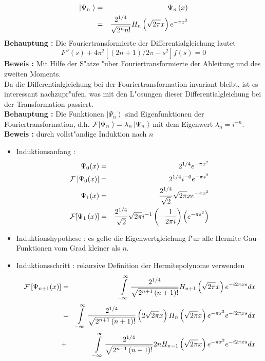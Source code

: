 \documentclass[11pt,twoside]{report}
\begin{document}
\begin{eqnarray*}
  |\Psi_n\left.\right> & = & \Psi_n \left( x \right) \\
                       & = & \frac{2^{1/4}} {\sqrt{2^n n!}} H_n \left( \sqrt{2\pi}x \right) e^{ -\pi x^2 } 
\end{eqnarray*}
{\bf Behauptung : } Die Fouriertransformierte der Differentialgleichung lautet
$$F''\left( s\right) + 4\pi ^2\left[ \left(2n + 1\right)/2 \pi - s^2\right] f\left( s\right) = 0$$
{\bf Beweis : } Mit Hilfe der S"atze "uber Fouriertransformierte der Ableitung und des zweiten Moments. \\
Da die Differentialgleichung bei der Fouriertransformation invariant bleibt, ist es interessant nachzupr"ufen, was mit den L"osungen dieser Differentialgleichung bei der Transformation passiert. \\[1cm]
{\bf Behauptung :} Die Funktionen 
$ |\Psi_n \left. \right> $ sind Eigenfunktionen der Fouriertransformation, d.h. $ {\cal F}|\Psi_n\left.\right> = \lambda_n \, |\Psi_n\left.\right> $ mit dem Eigenwert $\lambda_n = i^{-n}$. \\
{\bf Beweis :} durch vollst"andige Induktion nach $n$ 
\begin{itemize}
\item Induktionsanfang : 
\begin{eqnarray*}
 \Psi_0 (x) & = & 
 2^{1/4} e^{ -\pi x^2 }\\
 {\cal F} \left[\Psi_0 (x)\right] & = &
 2^{1/4} i^{-0} e^{ -\pi s^2 } \\
 \Psi_1 (x) & = &
 \frac{2^{1/4}}{\sqrt{2}} \sqrt{2 \pi}x e^{ -\pi x^2 } \\
 {\cal F}[ \Psi_1 \left( x \right)] & = & 
 \frac{2^{1/4}}{\sqrt{2}} \sqrt{2\pi} i^{-1} \left( - \frac{1}{2\pi i} \right) \left( e^{ -\pi s^2 } \right)                   
\end{eqnarray*}
\item Induktionshypothese : es gelte die Eigenwertgleichung f"ur alle Hermite-Gau\3-Funk\-tio\-nen vom Grad kleiner als $n$.
\item Induktionsschritt : rekursive Definition der Hermitepolynome verwenden
\begin{eqnarray*}
  {\cal F} \left[ \Psi_{n+1} (x) \right]  & = &
  \int\limits_{-\infty}^{\infty} \frac{2^{1/4}}{\sqrt{2^{n+1} \left( n+1 \right) ! }} H_{n+1} \left( \sqrt{2\pi}x  \right) e^{ -i2\pi xs } dx \\ & = &
  \int\limits_{-\infty}^{\infty} \frac{2^{1/4}}{\sqrt{2^{n+1} \left( n+1 \right) ! }} \left( 2\sqrt{2\pi}x \right) H_n\left( \sqrt{2\pi}x \right) e^{ -\pi x^2 } e^{ -i2\pi xs }  dx \\ & + &
  \int\limits_{-\infty}^{\infty} \frac{2^{1/4}}{\sqrt{2^{n+1} \left( n+1 \right) ! }} 2n H_{n-1} \left( \sqrt{2\pi}x \right) e^{ -\pi x^2 } e^{ -i2\pi xs } dx 
\end{eqnarray*}
\end{itemize}
\end{document}
